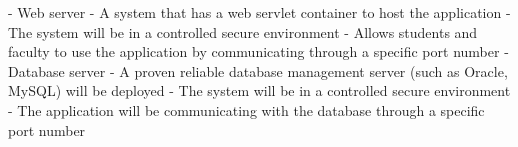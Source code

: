 - Web server
	- A system that has a web servlet container to host the application
	- The system will be in a controlled secure environment 
	- Allows students and faculty to use the application by communicating through a specific port number
- Database server
	- A proven reliable database management server (such as Oracle, MySQL) will be deployed 
	- The system will be in a controlled secure environment 
	- The application will be communicating with the database through a specific port number
